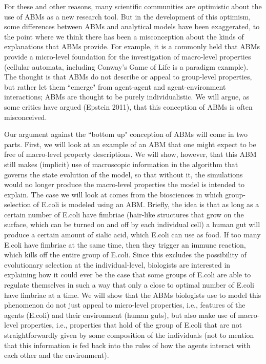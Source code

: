 \documentclass[11pt]{article}
\begin{document}
For these and other reasons, many scientific communities are optimistic about the use of ABMs as a new research tool.  But in the development of this optimism, some differences between ABMs and analytical models have been exaggerated, to the point where we think there has been a misconception about the kinds of explanations that ABMs provide. For example, it is a commonly held that ABMs provide a micro-level foundation for the investigation of macro-level properties (cellular automata, including Conway's Game of Life is a paradigm example).  The thought is that ABMs do not describe or appeal to group-level properties, but rather let them ``emerge" from agent-agent and agent-environment interactions; ABMs are thought to be purely individualistic. We will argue, as some critics have argued (Epstein 2011), that this conception of ABMs is often misconceived.

Our argument against the ``bottom up" conception of ABMs will come in two parts. First, we will look at an example of an ABM that one might expect to be free of macro-level property descriptions.  We will show, however, that this ABM still makes (implicit) use of macroscopic information in the algorithm that governs the state evolution of the model, so that without it, the simulations would no longer produce the macro-level properties the model is intended to explain. The case we will look at comes from the biosciences in which group-selection of E.coli is modeled using an ABM. Briefly, the idea is that as long as a certain number of E.coli have fimbriae (hair-like structures that grow on the surface, which can be turned on and off by each individual cell) a human gut will produce a certain amount of sialic acid, which E.coli can use as food. If too many E.coli have fimbriae at the same time, then they trigger an immune reaction, which kills off the entire group of E.coli. Since this excludes the possibility of evolutionary selection at the individual-level, biologists are interested in explaining how it could ever be the case that some groups of E.coli are able to regulate themselves in such a way that only a close to optimal number of E.coli have fimbriae at a time. We will show that the ABMs biologists use to model this phenomenon do not just appeal to micro-level properties, i.e., features of the agents (E.coli) and their environment (human guts), but also make use of macro-level properties, i.e., properties that hold of the group of E.coli that are not straightforwardly given by some composition of the individuals (not to mention that this information is fed back into the rules of how the agents interact with each other and the environment).
\end{document}
